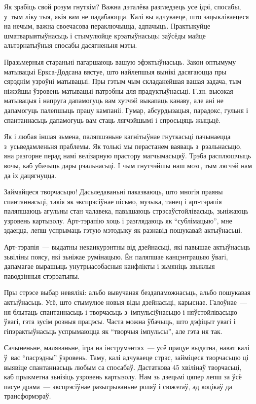 Як зрабіць свой розум гнуткім? Важна дэталёва разгледзець усе ідэі, спосабы, у~тым ліку тыя, якія вам не падабаюцца. Калі вы адчуваеце, што зацыкліваецеся на нечым, важна своечасова пераключыцца, адпачыць. Практыкуйце шматварыятыўнасьць і стымулюйце крэатыўнасьць: заўсёды майце альтэрнатыўныя спосабы дасягненьня мэты. 

Празьмерныя стараньні пагаршаюць вашую эфэктыўнасьць. Закон оптымуму матывацыі Еркса-Додсана вястуе, што найлепшыя вынікі дасягаюцца пры сярэднім узроўні матывацыі. Пры гэтым чым складанейшая вашая задача, тым ніжэйшы ўзровень матывацыі патрэбны для прадуктыўнасьці. Г.зн. высокая матывацыя і напруга дапамогуць вам хутчэй выкапаць канаву, але ані не дапамогуць палепшыць працу кампаніі. Гумар, абсурдызацыя, парадокс, гульня і спантаннасьць дапамогуць вам стаць лягчэйшымі і спросьцяць жыцьцё.

Як і любая іншая зьмена, паляпшэньне кагнітыўнае гнуткасьці пачынаецца з~усьведамленьня праблемы. Як толькі мы перастанем ваяваць з~рэальнасьцю, яна разгорне перад намі велізарную прастору магчымасьцяў. Трэба расплюшчыць вочы, каб убачыць дары рэальнасьці. І чым гнутчэйшы наш мозг, тым лягчэй нам да іх дацягнуцца.

Займайцеся творчасьцю! Дасьледаваньні паказваюць, што многія праявы спантаннасьці, такія як экспрэсіўнае пісьмо, музыка, танец і арт-тэрапія паляпшаюць агульны стан чалавека, павышаюць стрэсаўстойлівасьць, зьніжаюць узровень картызолу. Арт-тэрапію хоць і разглядаюць як ``сублімацыю'', мне здаецца, лепш успрымаць гэтую мэтодыку як разнавід пошукавай актыўнасьці.

Арт-тэрапія~--- выдатны неканкурэнтны від дзейнасьці, які павышае актыўнасьць зьвіліны поясу, які зьніжае румінацыю. Ён паляпшае канцэнтрацыю ўвагі, дапамагае вырашыць унутрыасобасныя канфлікты і зьмяніць звыклыя паводзінныя стэрэатыпы. 

Пры стрэсе выбар невялікі: альбо вывучаная бездапаможнасьць, альбо пошукавая актыўнасьць. Усё, што стымулюе новыя віды дзейнасьці, карыснае. Галоўнае~--- ня блытаць спантаннасьць і творчасьць з~імпульсіўнасьцю і няўстойлівасьцю ўвагі, гэта зусім розныя працэсы. Часта можна ўбачыць, што дэфіцыт увагі і гіпэрактыўнасьць успрымаюцца як ``творчыя імпульсы'', але гэта ня так.

Сачыненьне, маляваньне, ігра на інструмэнтах~--- усё працуе выдатна, нават калі ў~вас ``пасрэдны'' ўзровень. Таму, калі адчуваеце стрэс, займіцеся творчасьцю ці выявіце спантаннасьць любым са спосабаў. Дастаткова 45 хвілінаў творчасьці, каб прыкметна зьнізіць узровень картызолу. Нам зь дзецьмі цяпер лепш за ўсё пасуе драма~--- экспрэсіўнае разыгрываньне роляў і сюжэтаў, ад коцікаў да трансформэраў.

